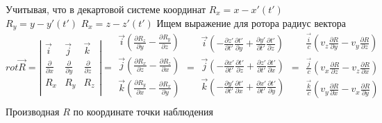 \documentclass[11pt]{article}
\begin{document}
Учитывая, что в декартовой системе координат
\({{R}_{x}}=x-x'\left( t' \right)\) \({{R}_{y}}=y-y'\left( t' \right)\)
\({{R}_{x}}=z-z'\left( t' \right)\) Ищем выражение для ротора радиус
вектора \[rot\overrightarrow{R}=\left| \begin{matrix}
   \overrightarrow{i} & \overrightarrow{j} & \overrightarrow{k}  \\
   \frac{\partial }{\partial x} & \frac{\partial }{\partial y} & \frac{\partial }{\partial z}  \\
   {{R}_{x}} & {{R}_{y}} & {{R}_{z}}  \\
\end{matrix} \right|=\begin{matrix}
   \overrightarrow{i}\left( \frac{\partial {{R}_{z}}}{\partial y}-\frac{\partial {{R}_{y}}}{\partial z} \right)  \\
   \overrightarrow{j}\left( \frac{\partial {{R}_{x}}}{\partial z}-\frac{\partial {{R}_{z}}}{\partial x} \right)  \\
   \overrightarrow{k}\left( \frac{\partial {{R}_{y}}}{\partial x}-\frac{\partial {{R}_{x}}}{\partial y} \right)  \\
\end{matrix}=\begin{matrix}
   \overrightarrow{i}\left( -\frac{\partial z'}{\partial t'}\frac{\partial t'}{\partial y}+\frac{\partial y'}{\partial t'}\frac{\partial t'}{\partial z} \right)  \\
   \overrightarrow{j}\left( -\frac{\partial x'}{\partial t'}\frac{\partial t'}{\partial z}+\frac{\partial z'}{\partial t'}\frac{\partial t'}{\partial x} \right)  \\
   \overrightarrow{k}\left( -\frac{\partial y'}{\partial t'}\frac{\partial t'}{\partial x}+\frac{\partial x'}{\partial t'}\frac{\partial t'}{\partial y} \right)  \\
\end{matrix}=\begin{matrix}
   \frac{\overrightarrow{i}}{c}\left( {{v}_{z}}\frac{\partial R}{\partial y}-{{v}_{y}}\frac{\partial R}{\partial z} \right)  \\
   \frac{\overrightarrow{j}}{c}\left( {{v}_{x}}\frac{\partial R}{\partial z}-{{v}_{z}}\frac{\partial R}{\partial x} \right)  \\
   \frac{\overrightarrow{k}}{c}\left( {{v}_{y}}\frac{\partial R}{\partial x}-{{v}_{x}}\frac{\partial R}{\partial y} \right)  \\
\end{matrix}\] Производная \(R\) по координате точки наблюдения
\end{document}
